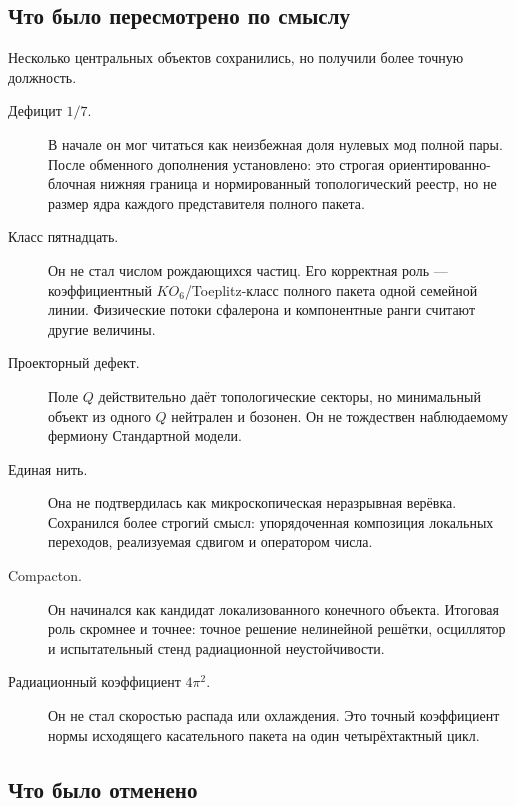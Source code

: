 \subsection{Что было пересмотрено по смыслу}

Несколько центральных объектов сохранились, но получили более точную
должность.

\begin{description}
 \item[Дефицит $1/7$.] В начале он мог читаться как неизбежная доля
 нулевых мод полной пары. После обменного дополнения установлено: это
 строгая ориентированно-блочная нижняя граница и нормированный
 топологический реестр, но не размер ядра каждого представителя полного
 пакета.

 \item[Класс пятнадцать.] Он не стал числом рождающихся частиц. Его
 корректная роль --- коэффициентный $KO_6$/Toeplitz-класс полного пакета
 одной семейной линии. Физические потоки сфалерона и компонентные ранги
 считают другие величины.

 \item[Проекторный дефект.] Поле $Q$ действительно даёт топологические
 секторы, но минимальный объект из одного $Q$ нейтрален и бозонен. Он не
 тождествен наблюдаемому фермиону Стандартной модели.

 \item[Единая нить.] Она не подтвердилась как микроскопическая
 неразрывная верёвка. Сохранился более строгий смысл: упорядоченная
 композиция локальных переходов, реализуемая сдвигом и оператором числа.

 \item[Compacton.] Он начинался как кандидат локализованного конечного
 объекта. Итоговая роль скромнее и точнее: точное решение нелинейной
 решётки, осциллятор и испытательный стенд радиационной неустойчивости.

 \item[Радиационный коэффициент $4\pi^2$.] Он не стал скоростью распада
 или охлаждения. Это точный коэффициент нормы исходящего касательного
 пакета на один четырёхтактный цикл.
\end{description}

\subsection{Что было отменено}

